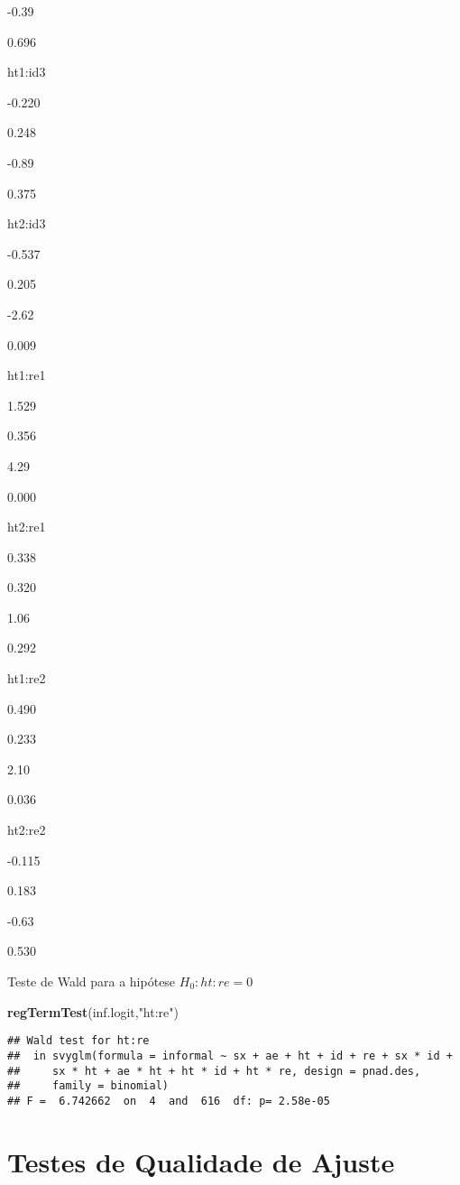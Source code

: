 \documentclass[]{book}
\newenvironment{Shaded}{\begin{snugshade}}{\end{snugshade}}
\newcommand{\KeywordTok}[1]{\textcolor[rgb]{0.13,0.29,0.53}{\textbf{{#1}}}}
\newcommand{\StringTok}[1]{\textcolor[rgb]{0.31,0.60,0.02}{{#1}}}
\newcommand{\NormalTok}[1]{{#1}}
\begin{document}
-0.39

0.696

ht1:id3

-0.220

0.248

-0.89

0.375

ht2:id3

-0.537

0.205

-2.62

0.009

ht1:re1

1.529

0.356

4.29

0.000

ht2:re1

0.338

0.320

1.06

0.292

ht1:re2

0.490

0.233

2.10

0.036

ht2:re2

-0.115

0.183

-0.63

0.530

Teste de Wald para a hipótese \(H_0: ht:re=0\)

\begin{Shaded}
\begin{Highlighting}[]
\KeywordTok{regTermTest}\NormalTok{(inf.logit,}\StringTok{"ht:re"}\NormalTok{)}
\end{Highlighting}
\end{Shaded}

\begin{verbatim}
## Wald test for ht:re
##  in svyglm(formula = informal ~ sx + ae + ht + id + re + sx * id + 
##     sx * ht + ae * ht + ht * id + ht * re, design = pnad.des, 
##     family = binomial)
## F =  6.742662  on  4  and  616  df: p= 2.58e-05
\end{verbatim}

\chapter{Testes de Qualidade de
Ajuste}\label{testes-de-qualidade-de-ajuste}
\end{document}
